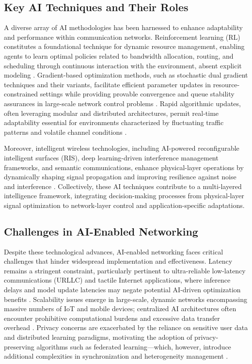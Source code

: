 \documentclass[11pt]{article}
\begin{document}
\subsection{Key AI Techniques and Their Roles}

A diverse array of AI methodologies has been harnessed to enhance adaptability and performance within communication networks. Reinforcement learning (RL) constitutes a foundational technique for dynamic resource management, enabling agents to learn optimal policies related to bandwidth allocation, routing, and scheduling through continuous interaction with the environment, absent explicit modeling \cite{ref11,ref12}. Gradient-based optimization methods, such as stochastic dual gradient techniques and their variants, facilitate efficient parameter updates in resource-constrained settings while providing provable convergence and queue stability assurances in large-scale network control problems \cite{ref13,ref14}. Rapid algorithmic updates, often leveraging modular and distributed architectures, permit real-time adaptability essential for environments characterized by fluctuating traffic patterns and volatile channel conditions \cite{ref15}. 

Moreover, intelligent wireless technologies, including AI-powered reconfigurable intelligent surfaces (RIS), deep learning-driven interference management frameworks, and semantic communications, enhance physical-layer operations by dynamically shaping signal propagation and improving resilience against noise and interference \cite{ref16,ref49,ref50}. Collectively, these AI techniques contribute to a multi-layered intelligence framework, integrating decision-making processes from physical-layer signal optimization to network-layer control and application-specific adaptations.

\subsection{Challenges in AI-Enabled Networking}

Despite these technological advances, AI-enabled networking faces critical challenges that hinder widespread implementation and effectiveness. Latency remains a stringent constraint, particularly pertinent to ultra-reliable low-latency communications (URLLC) and tactile Internet applications, where inference delays and model update latencies may negate potential AI-driven optimization benefits \cite{ref26,ref27}. Scalability issues emerge in large-scale, dynamic networks encompassing massive numbers of IoT and mobile devices; centralized AI architectures often encounter prohibitive computational burdens and excessive data transfer overhead \cite{ref28}. Privacy concerns are exacerbated by the reliance on sensitive user data and distributed learning paradigms, motivating the adoption of privacy-preserving algorithms such as federated learning—which, however, introduce additional complexities in synchronization and heterogeneity management \cite{ref29,ref52}. 
\end{document}

